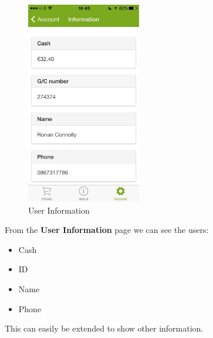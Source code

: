 \begin{minipage}{5cm}
	\begin{figure}[H]
		\includegraphics[width=5cm]{img/mobile-app/screen-shots/IMG_2917.jpg}
		\caption{User Information}
	\end{figure}
\end{minipage} \hfill
\begin{minipage}{0.55\textwidth}
From the \textbf{User Information} page we can see the users:
	\begin{itemize}
		\item Cash
		\item ID
		\item Name
		\item Phone
	\end{itemize}
This can easily be extended to show other information.
\end{minipage}

